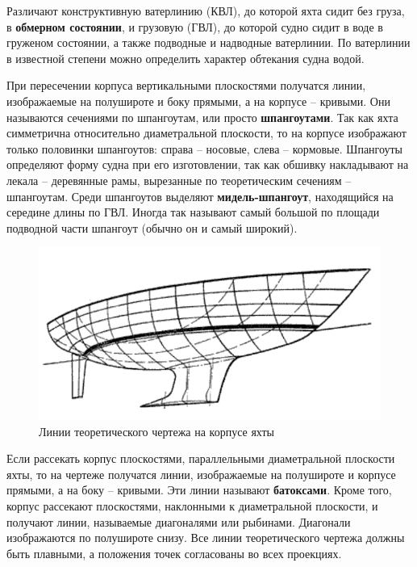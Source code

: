 \documentclass[a4paper, 12pt, twoside, final]{scrbook}
\begin{document}
Различают конструктивную ватерлинию (КВЛ), до которой яхта сидит без груза, в \textbf{обмерном состоянии}, и грузовую (ГВЛ), до которой судно сидит в воде в груженом состоянии, а также подводные и надводные ватерлинии. По ватерлинии в известной степени можно определить характер обтекания судна водой.

При пересечении корпуса вертикальными плоскостями получатся линии, изображаемые на полушироте и боку прямыми, а на корпусе \--- кривыми. Они называются сечениями по шпангоутам, или просто \textbf{шпангоутами}. Так как яхта симметрична относительно диаметральной плоскости, то на корпусе изображают только половинки шпангоутов: справа \--- носовые, слева \--- кормовые. Шпангоуты определяют форму судна при его изготовлении, так как обшивку накладывают на лекала \--- деревянные рамы, вырезанные по теоретическим сечениям \--- шпангоутам. Среди шпангоутов выделяют \textbf{мидель-шпангоут}, находящийся на середине длины по ГВЛ. Иногда так называют самый большой по площади подводной части шпангоут (обычно он и самый широкий).

\begin{figure}[htbp]
   \centering
   \includegraphics{86_Linii_teor_chertezha} %
   \caption{Линии теоретического чертежа на корпусе яхты}
   \label{fig:86}
\end{figure}

Если рассекать корпус плоскостями, параллельными диаметральной плоскости яхты, то на чертеже получатся линии, изображаемые на полушироте и корпусе прямыми, а на боку \--- кривыми. Эти линии называют \textbf{батоксами}. Кроме того, корпус рассекают плоскостями, наклонными к диаметральной плоскости, и получают линии, называемые диагоналями или рыбинами. Диагонали изображаются по полушироте снизу.
Все линии теоретического чертежа должны быть плавными, а положения точек согласованы во всех проекциях.
\end{document}
